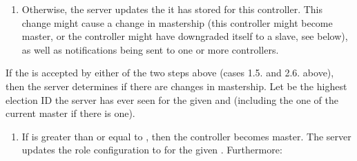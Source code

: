 \documentclass[11pt]{article}
\begin{document}
{\begin{enumerate}
\begin{enumerate}
\begin{enumerate}
\item{}
If the controller is a slave, this is a no-op and the 
is ignored. No response is sent to any controller.%
\end{enumerate}%

\item{}
Otherwise, the server updates the  it has stored for this
controller. This change might cause a change in mastership (this
controller might become master, or the controller might have downgraded
itself to a slave, see below), as well as notifications being sent to one
or more controllers.%
\end{enumerate}%
\end{enumerate}%

\noindent{}If the  is accepted by either of the two steps above
(cases 1.5. and 2.6. above), then the server determines if there are changes in
mastership. Let  be the highest election ID the server has
ever seen for the given  and  (including the one of the
current master if there is one).%

\begin{enumerate}%

\item{}
If  is greater than or equal to , then the
controller becomes master. The server updates the role configuration to
 for the given . Furthermore:%


\end{enumerate}}
\end{document}
